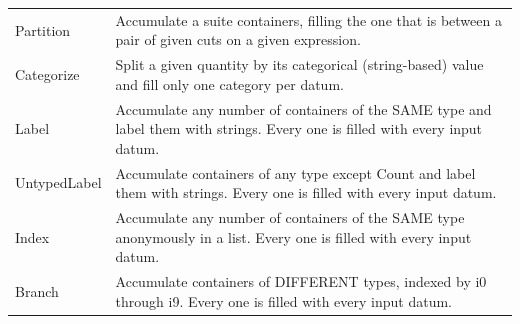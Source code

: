 \documentclass{beamer}
\begin{document}
\begin{frame}
\begin{minipage}{\linewidth}
\begin{tabular}{| p{0.1\linewidth} p{0.9\linewidth} |}
Partition       & Accumulate a suite containers, filling the one that is between a pair of given cuts on a given expression. \\
Categorize      & Split a given quantity by its categorical (string-based) value and fill only one category per datum. \\\hline
Label           & Accumulate any number of containers of the SAME type and label them with strings. Every one is filled with every input datum. \\
UntypedLabel    & Accumulate containers of any type except Count and label them with strings. Every one is filled with every input datum. \\
Index           & Accumulate any number of containers of the SAME type anonymously in a list. Every one is filled with every input datum. \\
Branch          & Accumulate containers of DIFFERENT types, indexed by i0 through i9. Every one is filled with every input datum. \\\hline
\end{tabular}
\end{minipage}
\end{frame}
\end{document}
